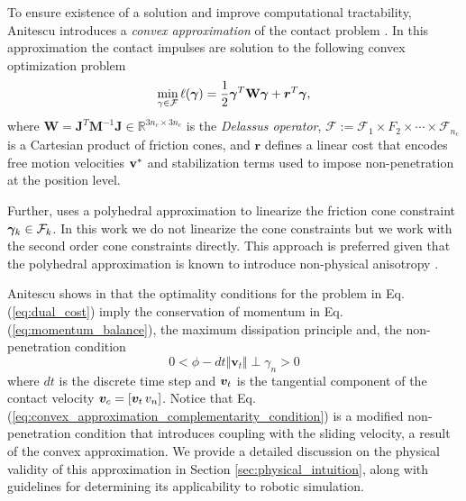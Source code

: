To ensure existence of a solution and improve computational tractability,
Anitescu introduces a \textit{convex approximation} of the contact
problem \cite{bib:anitescu2006}. In this approximation the contact impulses are
solution to the following convex optimization problem
\begin{eqnarray}
	\min_{\gamma\in \mathcal{F}} \ell(\bgamma) =
	\frac{1}{2}\bgamma^T\mathbf{W}\bgamma + {\bm r}^T
	\bgamma,
	\label{eq:dual_cost}
\end{eqnarray}
where $\mathbf{W} =
\mathbf{J}^T\mathbf{M}^{-1}\mathbf{J}\in\mathbb{R}^{3n_c\times 3n_c}$ is the
\emph{Delassus operator}, $\mathcal{F} := \mathcal{F}_1 \times F_2 \times \cdots
\times \mathcal{F}_{n_c}$ is a Cartesian product of friction cones, and ${\bm
r}$ defines a linear cost  that encodes free motion velocities ${\mathbf{v}}^*$ and
stabilization terms used to impose non-penetration at the position level.

Further, \cite{bib:anitescu2006} uses a polyhedral approximation to linearize
the friction cone constraint ${\bm\gamma}_k\in\mathcal{F}_k$. In this work we do not
linearize the cone constraints but we work with the second order cone
constraints directly. This approach is preferred given that the polyhedral
approximation is known to introduce non-physical anisotropy
\cite{bib:li2018implicit}.

Anitescu shows in \cite{bib:anitescu2006} that the optimality conditions for the
problem in Eq. (\ref{eq:dual_cost}) imply the conservation of momentum in Eq.
(\ref{eq:momentum_balance}), the maximum dissipation principle and, the
non-penetration condition
\begin{equation}
	0 < \phi - dt \Vert {\bm v}_t \Vert \perp \gamma_n > 0
	\label{eq:convex_approximation_complementarity_condition}
\end{equation}
where $dt$ is the discrete time step and ${\bm{v}}_t$ is the tangential component
of the contact velocity ${\bm{v}}_c = [{\bm{v}}_t\,v_n]$. Notice that Eq.
(\ref{eq:convex_approximation_complementarity_condition}) is a modified
non-penetration condition that introduces
coupling with the sliding velocity, a result of the convex approximation. We
provide a detailed discussion on the physical validity of this approximation in
Section \ref{sec:physical_intuition}, along with guidelines for determining
its applicability to robotic simulation.

